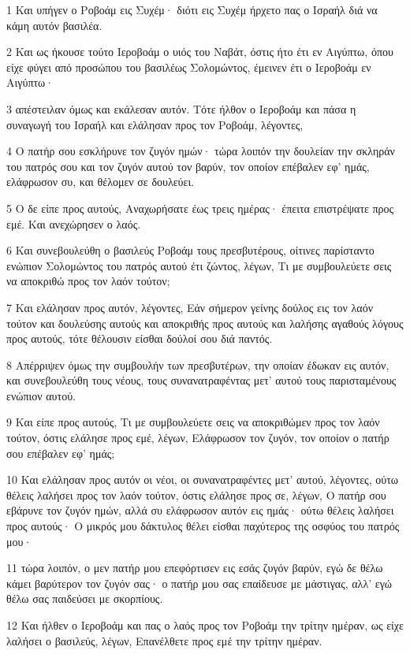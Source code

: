 \par 1 Και υπήγεν ο Ροβοάμ εις Συχέμ· διότι εις Συχέμ ήρχετο πας ο Ισραήλ διά να κάμη αυτόν βασιλέα.
\par 2 Και ως ήκουσε τούτο Ιεροβοάμ ο υιός του Ναβάτ, όστις ήτο έτι εν Αιγύπτω, όπου είχε φύγει από προσώπου του βασιλέως Σολομώντος, έμεινεν έτι ο Ιεροβοάμ εν Αιγύπτω·
\par 3 απέστειλαν όμως και εκάλεσαν αυτόν. Τότε ήλθον ο Ιεροβοάμ και πάσα η συναγωγή του Ισραήλ και ελάλησαν προς τον Ροβοάμ, λέγοντες,
\par 4 Ο πατήρ σου εσκλήρυνε τον ζυγόν ημών· τώρα λοιπόν την δουλείαν την σκληράν του πατρός σου και τον ζυγόν αυτού τον βαρύν, τον οποίον επέβαλεν εφ' ημάς, ελάφρωσον συ, και θέλομεν σε δουλεύει.
\par 5 Ο δε είπε προς αυτούς, Αναχωρήσατε έως τρεις ημέρας· έπειτα επιστρέψατε προς εμέ. Και ανεχώρησεν ο λαός.
\par 6 Και συνεβουλεύθη ο βασιλεύς Ροβοάμ τους πρεσβυτέρους, οίτινες παρίσταντο ενώπιον Σολομώντος του πατρός αυτού έτι ζώντος, λέγων, Τι με συμβουλεύετε σεις να αποκριθώ προς τον λαόν τούτον;
\par 7 Και ελάλησαν προς αυτόν, λέγοντες, Εάν σήμερον γείνης δούλος εις τον λαόν τούτον και δουλεύσης αυτούς και αποκριθής προς αυτούς και λαλήσης αγαθούς λόγους προς αυτούς, τότε θέλουσιν είσθαι δούλοί σου διά παντός.
\par 8 Απέρριψεν όμως την συμβουλήν των πρεσβυτέρων, την οποίαν έδωκαν εις αυτόν, και συνεβουλεύθη τους νέους, τους συνανατραφέντας μετ' αυτού τους παρισταμένους ενώπιον αυτού.
\par 9 Και είπε προς αυτούς, Τι με συμβουλεύετε σεις να αποκριθώμεν προς τον λαόν τούτον, όστις ελάλησε προς εμέ, λέγων, Ελάφρωσον τον ζυγόν, τον οποίον ο πατήρ σου επέβαλεν εφ' ημάς;
\par 10 Και ελάλησαν προς αυτόν οι νέοι, οι συνανατραφέντες μετ' αυτού, λέγοντες, ούτω θέλεις λαλήσει προς τον λαόν τούτον, όστις ελάλησε προς σε, λέγων, Ο πατήρ σου εβάρυνε τον ζυγόν ημών, αλλά συ ελάφρωσον αυτόν εις ημάς· ούτω θέλεις λαλήσει προς αυτούς· Ο μικρός μου δάκτυλος θέλει είσθαι παχύτερος της οσφύος του πατρός μου·
\par 11 τώρα λοιπόν, ο μεν πατήρ μου επεφόρτισεν εις εσάς ζυγόν βαρύν, εγώ δε θέλω κάμει βαρύτερον τον ζυγόν σας· ο πατήρ μου σας επαίδευσε με μάστιγας, αλλ' εγώ θέλω σας παιδεύσει με σκορπίους.
\par 12 Και ήλθεν ο Ιεροβοάμ και πας ο λαός προς τον Ροβοάμ την τρίτην ημέραν, ως είχε λαλήσει ο βασιλεύς, λέγων, Επανέλθετε προς εμέ την τρίτην ημέραν.
